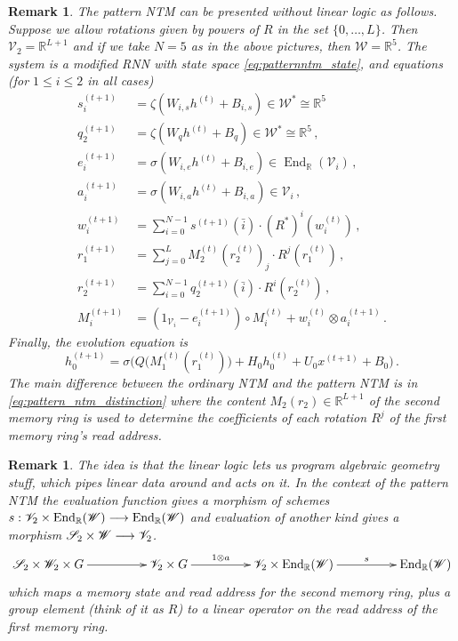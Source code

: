 \documentclass[english,letter paper,12pt,leqno]{article}
\theoremstyle{example}
\newtheorem{remark}[theorem]{Remark}
\numberwithin{equation}{section}
\def\be{\begin{equation}}
\def\ee{\end{equation}}
\DeclareMathOperator{\End}{End}
\begin{document}
\begin{remark}\label{remark:alt_presentation} The pattern NTM can be presented without linear logic as follows. Suppose we allow rotations given by powers of $R$ in the set $\{0,\ldots,L\}$. Then $\mathscr{V}_2 = \mathbb{R}^{L+1}$ and if we take $N = 5$ as in the above pictures, then $\mathscr{W} = \mathbb{R}^5$. The system is a modified RNN with state space \eqref{eq:patternntm_state}, and equations (for $1 \le i \le 2$ in all cases)
\begin{align}
s_i^{(t+1)} &= \zeta( W_{i,s} h^{(t)} + B_{i,s} ) \in \mathscr{W}^* \cong \mathbb{R}^5\,\\
q_2^{(t+1)} &= \zeta( W_q h^{(t)} + B_q ) \in \mathscr{W}^* \cong \mathbb{R}^5\,,\\
e_i^{(t+1)} &= \sigma( W_{i,e} h^{(t)} + B_{i,e} ) \in \End_{\mathbb{R}}(\mathscr{V}_i)\,,\\
a_i^{(t+1)} &= \sigma( W_{i,a} h^{(t)} + B_{i,a} ) \in \mathscr{V}_i\,,\\
w_i^{(t+1)} &= \sum_{i=0}^{N-1} s^{(t+1)}(\bar{i}) \cdot (R^*)^i( w^{(t)}_i )\,,\\
r_1^{(t+1)} &= \sum_{j=0}^L M_2^{(t)}(r_2^{(t)})_j \cdot R^j(r_1^{(t)})\,,\label{eq:pattern_ntm_distinction}\\
r_2^{(t+1)} &= \sum_{i=0}^{N-1} q_2^{(t+1)}(\bar{i}) \cdot R^i( r_2^{(t)} )\,,\\
M_i^{(t+1)} &= (1_{\mathscr{V}_i} - e_i^{(t+1)}) \circ M_i^{(t)} + w_i^{(t)} \otimes a_i^{(t+1)}\,.
\end{align}
Finally, the evolution equation is
\be
h_0^{(t+1)} = \sigma\Big( Q\big( M_1^{(t)}(r_1^{(t)}) \big) + H_0 h_0^{(t)} + U_0 x^{(t+1)} + B_0 \Big)\,.
\ee
The main difference between the ordinary NTM and the pattern NTM is in \eqref{eq:pattern_ntm_distinction} where the content $M_2(r_2) \in \mathbb{R}^{L+1}$ of the second memory ring is used to determine the coefficients of each rotation $R^j$ of the first memory ring's read address.
\end{remark}

\begin{remark} The idea is that the linear logic lets us program algebraic geometry stuff, which pipes linear data around and acts on it. In the context of the pattern NTM the evaluation function gives a morphism of schemes $s: \mathscr{V}_2 \times \End_{\mathbb{R}}(\mathscr{W}) \lto \End_{\mathbb{R}}(\mathscr{W})$ and evaluation of another kind gives a morphism $\mathscr{S}_2 \times \mathscr{W} \longrightarrow \mathscr{V}_2$. 
\[
\xymatrix@C+2pc{
\mathscr{S}_2 \times \mathscr{W}_2 \times G \ar[r] & \mathscr{V}_2 \times G \ar[r]^-{1 \otimes a} & \mathscr{V}_2 \times \End_{\mathbb{R}}(\mathscr{W}) \ar[r]^-s & \End_{\mathbb{R}}(\mathscr{W})
}
\]
which maps a memory state and read address for the second memory ring, plus a group element (think of it as $R$) to a linear operator on the read address of the first memory ring.
\end{remark}
\end{document}
